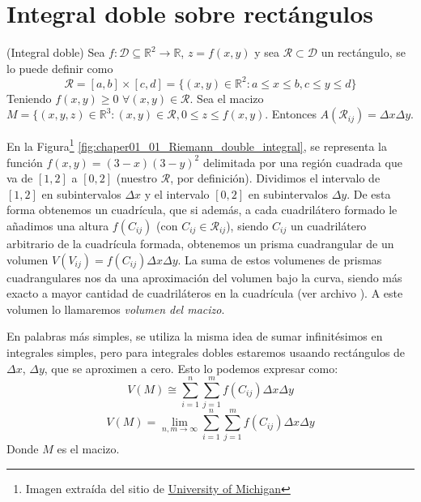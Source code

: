 \section{Integral doble sobre rect\'angulos}

\begin{definition}
(Integral doble) Sea $f: \mathcal{D} \subseteq \mathbb{R}^2 \rightarrow \mathbb{R}$, $z = f(x,y)$ y sea $\mathcal{R} \subset \mathcal{D}$ un rect\'angulo, se lo puede definir como
$$
\mathcal{R} = \left[a,b\right] \times \left[c,d\right] = \lbrace (x,y) \in \mathbb{R}^2: a \leq x \leq b, c \leq y \leq d \rbrace
$$
Teniendo $f(x,y) \geq 0$ $\forall(x,y) \in \mathcal{R}$. Sea el macizo $M = \lbrace (x,y,z) \in \mathbb{R}^3: (x,y) \in \mathcal{R},0 \leq z\leq f(x,y)$. Entonces $A(\mathcal{R}_{ij}) = \Delta x \Delta y$.
\end{definition}



En la Figura\footnote{Imagen extraída del sitio de \href{https://instruct.math.lsa.umich.edu/lecturedemos/ma215/docs/15_1/examples.html}{University of Michigan}} \ref{fig:chaper01_01_Riemann_double_integral}, se representa la funci\'on $f(x,y) = (3-x)(3-y)^2$ delimitada por una regi\'on cuadrada que va de $\left[1,2\right]$ a $\left[0,2\right]$ (nuestro $\mathcal{R}$, por definici\'on). Dividimos el intervalo de $\left[1,2\right]$ en subintervalos $\Delta x$ y el intervalo $\left[0,2\right]$ en subintervalos $\Delta y$. De esta forma obtenemos un cuadr\'icula, que si adem\'as, a cada cuadril\'atero formado le añadimos una altura $f(C_{ij})$ (con $C_{ij} \in \mathcal{R}_{ij}$), siendo $C_{ij}$ un cuadril\'atero arbitrario de la cuadr\'icula formada, obtenemos un prisma cuadrangular de un volumen $V(V_{ij})=f(C_{ij})\Delta x \Delta y$. La suma de estos volumenes de prismas cuadrangulares nos da una aproximaci\'on del volumen bajo la curva, siendo m\'as exacto a mayor cantidad de cuadril\'ateros en la cuadr\'icula (ver archivo ). A este volumen lo llamaremos \emph{volumen del macizo}.

En palabras m\'as simples, se utiliza la misma idea de sumar infinit\'esimos en integrales simples, pero para integrales dobles estaremos usaando rect\'angulos de $\Delta x$, $\Delta y$, que se aproximen a cero. Esto lo podemos expresar como:
$$
V(M)\cong \sum_{i=1}^{n}\sum_{j=1}^{m}f(C_{ij})\Delta x \Delta y
$$
$$
V(M) = \lim\limits_{n,m\longrightarrow \infty}\sum_{i=1}^{n}\sum_{j=1}^{m}f(C_{ij})\Delta x \Delta y
$$
Donde $M$ es el macizo.

